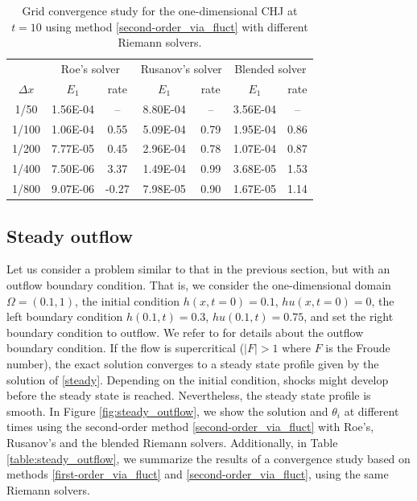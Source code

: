 \documentclass[preprint, 11pt]{article}
\begin{document}
\begin{table}[!ht]\scriptsize
  \begin{center}
    \begin{tabular}{||c||c|c||c|c||c|c||} \hline
      & \multicolumn{2}{c||}{Roe's solver}
      &\multicolumn{2}{c||}{Rusanov's solver}
      &\multicolumn{2}{c||}{Blended solver} \\ \cline{2-7}
      $\Delta x$ & $E_1$ & rate & $E_1$ & rate & $E_1$ & rate \\ \hline
      1/50  & 1.56E-04 &  --   & 8.80E-04 &  --  & 3.56E-04 &  --  \\
      1/100 & 1.06E-04 & 0.55  & 5.09E-04 & 0.79 & 1.95E-04 & 0.86 \\
      1/200 & 7.77E-05 & 0.45  & 2.96E-04 & 0.78 & 1.07E-04 & 0.87 \\
      1/400 & 7.50E-06 & 3.37  & 1.49E-04 & 0.99 & 3.68E-05 & 1.53 \\
      1/800 & 9.07E-06 & -0.27 & 7.98E-05 & 0.90 & 1.67E-05 & 1.14 \\ \hline
    \end{tabular}
    \caption{Grid convergence study for the one-dimensional CHJ at $t=10$
      using method \eqref{second-order_via_fluct} with different Riemann solvers.\label{table:chj_1D}}
  \end{center}
\end{table}

\subsection{Steady outflow}\label{sec:steady_outflow}
Let us consider a problem similar to that in the previous section, but with an outflow boundary condition.
That is, we consider the one-dimensional domain $\Omega=(0.1,1)$, the initial condition
$h(x,t=0)=0.1$, $hu(x,t=0)=0$, the left boundary condition $h(0.1,t)=0.3$, $hu(0.1,t)=0.75$,
and set the right boundary condition to outflow.
We refer to \cite[\S 21.8.5]{leveque2002finite} for details about the outflow boundary condition.
If the flow is supercritical ($|F|>1$ where $F$ is the Froude number), the exact solution converges to a
steady state profile given by the solution of \eqref{steady}.
Depending on the initial condition, shocks might develop before the steady state is reached.
Nevertheless, the steady state profile is smooth.
In Figure \ref{fig:steady_outflow}, we show the solution and $\theta_i$ at different times using
the second-order method \eqref{second-order_via_fluct}
with Roe's, Rusanov's and the blended Riemann solvers.
Additionally, in Table \ref{table:steady_outflow}, we summarize the results of a convergence study
based on methods \eqref{first-order_via_fluct} and
\eqref{second-order_via_fluct}, using the same Riemann solvers.
\end{document}

